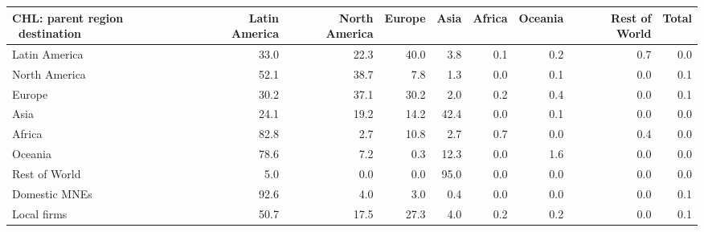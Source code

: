 \begin{tabular}{lrrrrrrrr}
\toprule
CHL: parent region \ destination & Latin America & North America & Europe & Asia & Africa & Oceania & Rest of World & Total \\
\midrule
Latin America & 33.0 & 22.3 & 40.0 & 3.8 & 0.1 & 0.2 & 0.7 & 0.0 \\
North America & 52.1 & 38.7 & 7.8 & 1.3 & 0.0 & 0.1 & 0.0 & 0.1 \\
Europe & 30.2 & 37.1 & 30.2 & 2.0 & 0.2 & 0.4 & 0.0 & 0.1 \\
Asia & 24.1 & 19.2 & 14.2 & 42.4 & 0.0 & 0.1 & 0.0 & 0.0 \\
Africa & 82.8 & 2.7 & 10.8 & 2.7 & 0.7 & 0.0 & 0.4 & 0.0 \\
Oceania & 78.6 & 7.2 & 0.3 & 12.3 & 0.0 & 1.6 & 0.0 & 0.0 \\
Rest of World & 5.0 & 0.0 & 0.0 & 95.0 & 0.0 & 0.0 & 0.0 & 0.0 \\
Domestic MNEs & 92.6 & 4.0 & 3.0 & 0.4 & 0.0 & 0.0 & 0.0 & 0.1 \\
Local firms & 50.7 & 17.5 & 27.3 & 4.0 & 0.2 & 0.2 & 0.0 & 0.1 \\
\bottomrule
\end{tabular}
